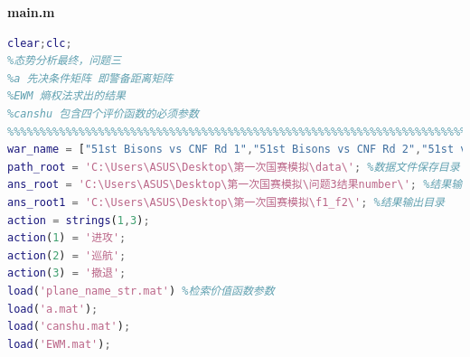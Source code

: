 \documentclass{my_paper}
\begin{document}
\textbf{main.m}
\begin{lstlisting}[language=matlab]
    %%%%%%%%%%%%%%%%%%%%%%%%%%%%%%%%%%%%%%%%%%%%%%%%%%%%%%%%%%%%%%%%%%%%%%%%%%%
clear;clc;
%态势分析最终，问题三
%a 先决条件矩阵 即警备距离矩阵
%EWM 熵权法求出的结果 
%canshu 包含四个评价函数的必须参数
%%%%%%%%%%%%%%%%%%%%%%%%%%%%%%%%%%%%%%%%%%%%%%%%%%%%%%%%%%%%%%%%%%%%%%%%%%%
war_name = ["51st Bisons vs CNF Rd 1","51st Bisons vs CNF Rd 2","51st vs 36th R1","51st vs 36th R2","51st vs uvaf round 1","51st vs uvaf round 2","51st vs uvaf round 3","51stKIAP_vs_36th_Round_1","51stKIAP_vs_36th_Round_2","51stKIAP_vs_107th_Round_1"];
path_root = 'C:\Users\ASUS\Desktop\第一次国赛模拟\data\'; %数据文件保存目录
ans_root = 'C:\Users\ASUS\Desktop\第一次国赛模拟\问题3结果number\'; %结果输出目录
ans_root1 = 'C:\Users\ASUS\Desktop\第一次国赛模拟\f1_f2\'; %结果输出目录
action = strings(1,3);
action(1) = '进攻';
action(2) = '巡航';
action(3) = '撤退';
load('plane_name_str.mat') %检索价值函数参数
load('a.mat');
load('canshu.mat');
load('EWM.mat');


\end{lstlisting}
\end{document}
